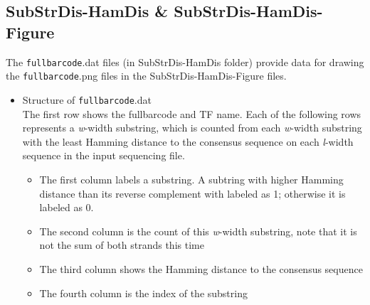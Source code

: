 \documentclass[a4paper,10pt]{article}
\begin{document}
\subsection{SubStrDis-HamDis \& SubStrDis-HamDis-Figure}
The \texttt{fullbarcode}.dat files (in SubStrDis-HamDis folder) provide data for drawing the \texttt{fullbarcode}.png files in the SubStrDis-HamDis-Figure files.
\begin{itemize}
 \item Structure of \texttt{fullbarcode}.dat \\
 The first row shows the fullbarcode and TF name.
 Each of the following rows represents a \textit{w}-width substring, which is counted from each \textit{w}-width substring with
 the least Hamming distance to the consensus sequence on each \textit{l}-width sequence in the input sequencing file.
   \begin{itemize}
    \item The first column labels a substring. A subtring with higher Hamming distance than its reverse complement with labeled as 1; otherwise it is labeled as 0.
    \item The second column is the count of this \textit{w}-width substring, note that it is not the sum of both strands this time
    \item The third column shows the Hamming distance to the consensus sequence
    \item The fourth column is the index of the substring
   \end{itemize}


\end{itemize}
\end{document}
